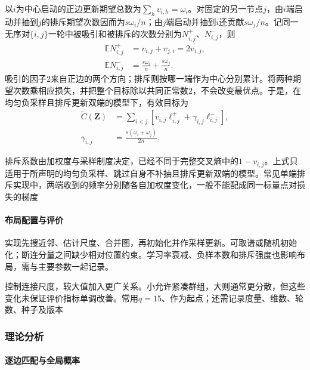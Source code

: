以$i$为中心启动的正边更新期望总数为$\sum_hv_{i,h}=\omega_i$。对固定的另一节点$j$，由$i$端启动并抽到$j$的排斥期望次数因而为$s\omega_i/n$；由$j$端启动并抽到$i$还贡献$s\omega_j/n$。记同一无序对$\{i,j\}$一轮中被吸引和被排斥的次数分别为$N^+_{i,j}$、$N^-_{i,j}$，则
\[
  \begin{aligned}
    \mathbb{E}N^+_{i,j}
      &=v_{i,j}+v_{j,i}=2v_{i,j},\\
    \mathbb{E}N^-_{i,j}
      &=\frac{s\omega_i}{n}+\frac{s\omega_j}{n}.
  \end{aligned}
\]
吸引的因子$2$来自正边的两个方向；排斥则按哪一端作为中心分别累计。将两种期望次数乘相应损失，并把整个目标除以共同正常数$2$，不会改变最优点。于是，在均匀负采样且排斥更新双端的模型下，有效目标为
\begin{equation}
  \label{eq:dim-umap-effective-loss}
  \begin{aligned}
    \widetilde C(\bm{Z})
      &=\sum_{i<j}\left[
        v_{i,j}\ell^+_{i,j}
        +\gamma_{i,j}\ell^-_{i,j}\right],\\
    \gamma_{i,j}&=\frac{s(\omega_i+\omega_j)}{2n}.
  \end{aligned}
\end{equation}

排斥系数由加权度与采样制度决定，已经不同于完整交叉熵中的$1-v_{i,j}$。上式只适用于所声明的均匀负采样、跳过自身不补抽且排斥更新双端的模型。常见单端排斥实现中，两端收到的频率分别随各自加权度变化，一般不能配成同一标量点对损失的梯度

\paragraph{布局配置与评价}

实现先搜近邻、估计尺度、合并图，再初始化并作采样更新。可取谱或随机初始化；断连分量之间缺少相对位置约束。学习率衰减、负样本数和排斥强度也影响布局，需与主要参数一起记录。

控制连接尺度，较大值加入更广关系。小允许紧凑群组，大则通常更分散，但这些变化未保证评价指标单调改善。常用$q=15$、作为起点；还需记录度量、维数、轮数、种子及版本

\subsubsection{理论分析}

\paragraph{逐边匹配与全局概率}

